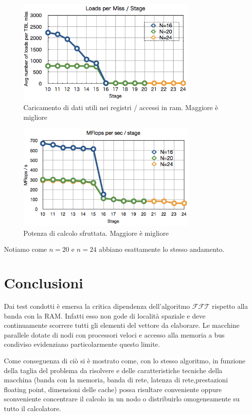 \documentclass[12pt,a4paper,oneside,openright]{article}
\begin{document}
\begin{figure}[h!]
  \centering
      \includegraphics[width=0.8\textwidth]{immagini/Miss}
  \caption{Caricamento di dati utili nei registri / accessi in ram. Maggiore è migliore}
\label{Miss}
\end{figure}

\begin{figure}[h!] 
  \centering
      \includegraphics[width=0.8\textwidth]{immagini/Mflops}
  \caption{Potenza di calcolo sfruttata. Maggiore è migliore}
\label{MFlops}
\end{figure}
Notiamo come $n=20$ e $n=24$ abbiano esattamente lo stesso andamento.

\section*{Conclusioni}

Dai test condotti è emersa la critica dipendenza dell'algoritmo $\mathcal{FFT}$ rispetto alla banda con la RAM. Infatti esso non gode di località spaziale e deve continuamente scorrere tutti gli elementi del vettore da elaborare. Le macchine parallele dotate di nodi con processori veloci e accesso alla memoria a bus condiviso evidenziano particolarmente questo limite.

Come conseguenza di ciò si è mostrato come, con lo stesso algoritmo, in funzione della taglia del problema da risolvere e delle caratteristiche tecniche della macchina (banda con la memoria, banda di rete, latenza di rete,prestazioni floating point, dimensioni delle cache) possa risultare conveniente oppure sconveniente concentrare il calcolo in un nodo o distribuirlo omogeneamente su tutto il calcolatore.
\end{document}
